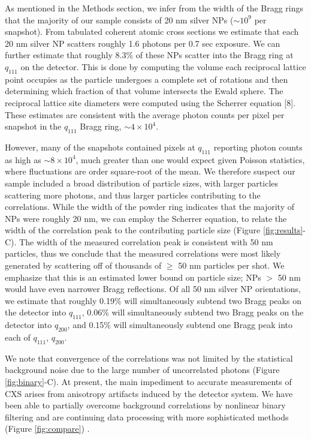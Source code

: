 \documentclass [11pt,fleqn]{article}
\begin{document}
As mentioned in the Methods section, we infer from the width of the Bragg rings that the majority of our sample consists of 20 nm silver NPs ($\sim10^9$ per snapshot). From tabulated coherent atomic cross sections \cite{Henke:1993wx} we estimate that each 20 nm silver NP scatters roughly 1.6 photons per 0.7 sec exposure. We can further estimate that roughly 8.3\% of these NPs scatter into the Bragg ring at $q_{111}$ on the detector. This is done by computing the volume each reciprocal lattice point occupies as the particle undergoes a complete set of rotations and then determining which fraction of that volume intersects the Ewald sphere. The reciprocal lattice site diameters were computed using the Scherrer equation [8]. These estimates are consistent with the average photon counts per pixel per snapshot in the $q_{111}$ Bragg ring, $\sim 4 \times 10^4$. 

However, many of the snapshots contained pixels at $q_{111}$ reporting photon counts as high as $\sim 8 \times 10^4$, much greater than one would expect given Poisson statistics, where fluctuations are order square-root of the mean. We therefore suspect our sample included a broad distribution of particle sizes, with larger particles scattering more photons, and thus larger particles contributing to the correlations. While the width of the powder ring indicates that the majority of NPs were roughly 20 nm, we can employ the Scherrer equation, to relate the width of the correlation peak to the contributing particle size (Figure \ref{fig:results}-C). The width of the measured correlation peak is consistent with 50 nm particles, thus we conclude that the measured correlations were most likely generated by scattering off of thousands of $\ge$ 50 nm particles per shot. We emphasize that this is an estimated lower bound on particle size;  NPs $>$ 50 nm would have even narrower Bragg reflections. Of all 50 nm silver NP orientations, we estimate that roughly 0.19\% will simultaneously subtend two Bragg peaks on the detector into $q_{111}$, 0.06\% will simultaneously subtend two Bragg peaks on the detector into $q_{200}$, and 0.15\% will simultaneously subtend one Bragg peak into each of $q_{111}$, $q_{200}$.

We note that convergence of the correlations was not limited by the statistical background noise due to the large number of uncorrelated photons (Figure \ref{fig:binary}-C). At present, the main impediment to accurate measurements of CXS arises from anisotropy artifacts induced by the detector system.  We have been able to partially overcome background correlations by nonlinear binary filtering and are continuing data processing with more sophisticated methods (Figure \ref{fig:compare}) .
\end{document}
